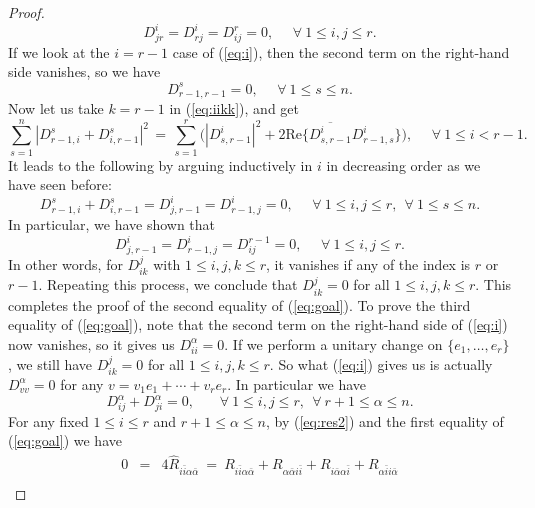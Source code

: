 \documentclass{amsart}
\begin{document}
\begin{proof}
\begin{equation*}  \label{eq:claimDr}
 D^i_{jr}=D^i_{rj}=D^r_{ij} =0, \ \ \ \ \ \ \forall \ 1\leq i,j\leq r.
 \end{equation*}
If we look at the $i=r\!-\!1$ case of (\ref{eq:i}), then the second term on the right-hand side vanishes, so we have
\begin{equation}  \label{eq:Dr-1r-1}
 D^s_{r\!-\!1,r\!-\!1}=0, \ \ \ \ \ \ \forall \ 1\leq s\leq n.
 \end{equation}
Now let us take $k=r\!-\!1$ in (\ref{eq:iikk}), and get
\begin{equation}  \label{eq:iir-1r-1}
 \sum_{s=1}^n |D^s_{r\!-\!1,i}+D^s_{i,r\!-\!1}|^2 \, = \, \sum_{s=1}^r \big(  |D^i_{s,r\!-\!1}|^2 + 2\mbox{Re} \{  \overline{D^i_{s,r\!-\!1}} D^i_{r\!-\!1,s} \} \big) , \ \ \ \ \ \ \forall \ 1\leq i<r\!-\!1.
 \end{equation}
It leads to the following by arguing inductively in $i$ in decreasing order as we have seen before:
\begin{equation}  \label{eq:claimr-1}
 D^s_{r\!-\!1,i}+D^s_{i,r\!-\!1}=D^i_{j,r\!-\!1}=D^i_{r\!-\!1,j}=0, \ \ \ \ \ \ \forall \ 1\leq i,j\leq r, \ \ \forall \ 1\leq s\leq n.
 \end{equation}
In particular, we have shown that
$$ D^i_{j,r\!-\!1}=D^i_{r\!-\!1,j}=D^{r\!-\!1}_{ij} =0, \ \ \ \ \ \ \forall \ 1\leq i,j\leq r. $$
In other words, for $D^j_{ik}$ with $1\leq i,j,k\leq r$, it vanishes if any of the index is $r$ or $r\!-\!1$. Repeating this process, we conclude that 
$D^j_{ik}=0$ for all  $1\leq i,j,k\leq r$. This completes the proof of the second equality of (\ref{eq:goal}). To prove the third equality of (\ref{eq:goal}), note that the second term on the right-hand side of (\ref{eq:i}) now vanishes, so it gives us $D^{\alpha}_{ii}=0$. If we perform a unitary change on $\{ e_1, \ldots , e_r\}$, we still have $D^j_{ik}=0$ for all $1\leq i,j,k\leq r$. So what (\ref{eq:i}) gives us is actually $D^{\alpha}_{vv}=0$ for any $v=v_1e_1+\cdots + v_re_r$. In particular we have 
\begin{equation}  \label{eq:Dalphaij}
 D^{\alpha}_{ij}+ D^{\alpha}_{ji} =0 , \ \ \ \ \ \ \ \ \forall \ 1\leq i,j\leq r, \ \ \forall \ r\!+\!1\leq \alpha \leq n.
 \end{equation}
For any fixed $1\leq i\leq r$ and $r\!+\!1\leq \alpha \leq n$, by (\ref{eq:res2}) and the first equality of (\ref{eq:goal}) we have
\begin{eqnarray*}
0 & = & 4\widehat{R}_{i\bar{i}\alpha \bar{\alpha}} \ = \ R_{i\bar{i}\alpha \bar{\alpha}} + R_{\alpha \bar{\alpha}i\bar{i}}  + R_{i\bar{\alpha}\alpha \bar{i}} +R_{\alpha \bar{i}i\bar{\alpha}} \nonumber \\

\end{eqnarray*}
\end{proof}
\end{document}
